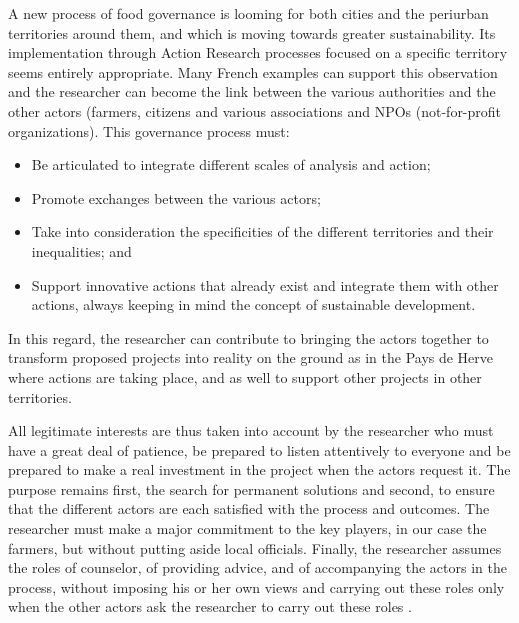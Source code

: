 \documentclass[10pt,a4paper]{article}
\begin{document}
\begin{multicols}{2}
A new process of food governance is looming for both cities and the periurban territories around them, and which is moving towards greater sustainability. Its implementation through Action Research processes focused on a specific territory seems entirely appropriate. Many French examples can support this observation and the researcher can become the link between the various authorities and the other actors (farmers, citizens and various associations and NPOs (not-for-profit organizations). This governance process must:

\begin{itemize}[noitemsep,nolistsep]
\item Be articulated to integrate different scales of analysis and action;
\item Promote exchanges between the various actors;
\item Take into consideration the specificities of the different territories and their inequalities; and 
\item Support innovative actions that already exist and integrate them with other actions, always keeping in mind the concept of sustainable development.
\end{itemize}

In this regard, the researcher can contribute to bringing the actors together to transform proposed projects into reality on the ground as in the Pays de Herve where actions are taking place, and as well to support other projects in other territories.

All legitimate interests are thus taken into account by the researcher who must have a great deal of patience, be prepared to listen attentively to everyone and be prepared to make a real investment in the project when the actors request it.  The purpose remains first, the search for permanent solutions and second, to ensure that the different actors are each satisfied with the process and outcomes.  The researcher must make a major commitment to the key players, in our case the farmers, but without putting aside local officials. Finally, the researcher assumes the roles of counselor, of providing advice, and of accompanying the actors in the process, without imposing his or her own views and carrying out these roles only when the other actors ask the researcher to carry out these roles \citep{r07}.

\end{multicols}

\vspace{\baselineskip}
\end{document}
